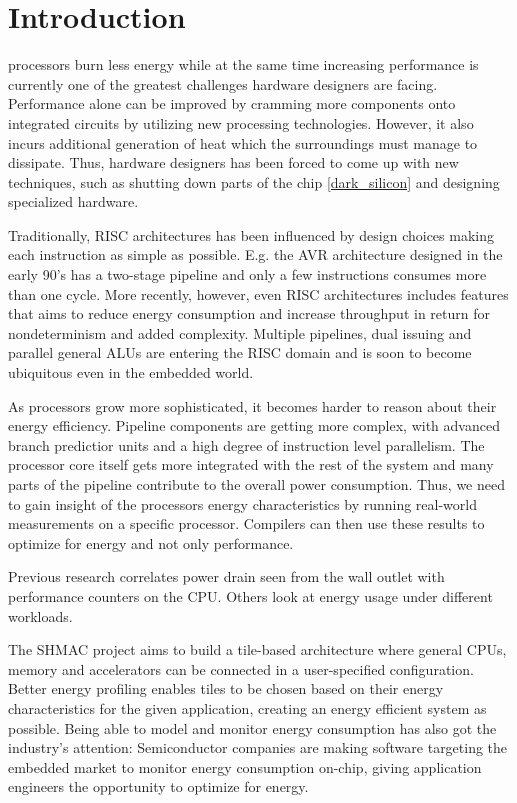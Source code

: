 \section{Introduction}

 processors burn less energy while at the same time
increasing performance is currently one of the greatest challenges hardware
designers are facing. Performance alone can be improved by cramming more
components onto integrated circuits \cite{moore1965cramming} by utilizing new
processing technologies. However, it also incurs additional generation of heat
which the surroundings must manage to dissipate. Thus, hardware designers has
been forced to come up with new techniques, such as shutting down parts of the
chip \ref{dark_silicon} and designing specialized hardware.

Traditionally, RISC architectures has been influenced by design choices making
each instruction as simple as possible\cite{sivarama}. E.g. the AVR architecture
designed in the early 90's has a two-stage pipeline and only a few instructions
consumes more than one cycle. More recently, however, even RISC architectures
includes features that aims to reduce energy consumption and increase throughput
in return for nondeterminism and added complexity. Multiple pipelines, dual
issuing and parallel general ALUs are entering the RISC domain and is soon to
become ubiquitous even in the embedded world.

As processors grow more sophisticated, it becomes harder to reason about their
energy efficiency. Pipeline components are getting more complex, with advanced
branch predictior units and a high degree of instruction level parallelism. The
processor core itself gets more integrated with the rest of the system and many
parts of the pipeline contribute to the overall power consumption\cite{bertran}.
Thus, we need to gain insight of the processors energy characteristics by
running real-world measurements on a specific processor. Compilers can then use
these results to optimize for energy and not only performance.

Previous research correlates power drain seen from the wall outlet with
performance counters on the CPU\cite{singh}\cite{bertran}\cite{bircher}. Others
look at energy usage under different workloads\cite{carrol2010analysis}.

The SHMAC project\cite{shmac} aims to build a tile-based architecture where
general CPUs, memory and accelerators can be connected in a user-specified
configuration. Better energy profiling enables tiles to be chosen based on their
energy characteristics for the given application, creating an energy efficient
system as possible. Being able to model and monitor energy consumption has also
got the industry's attention: Semiconductor companies are making software
targeting the embedded market to monitor energy consumption on-chip, giving
application engineers the opportunity to optimize for energy.

